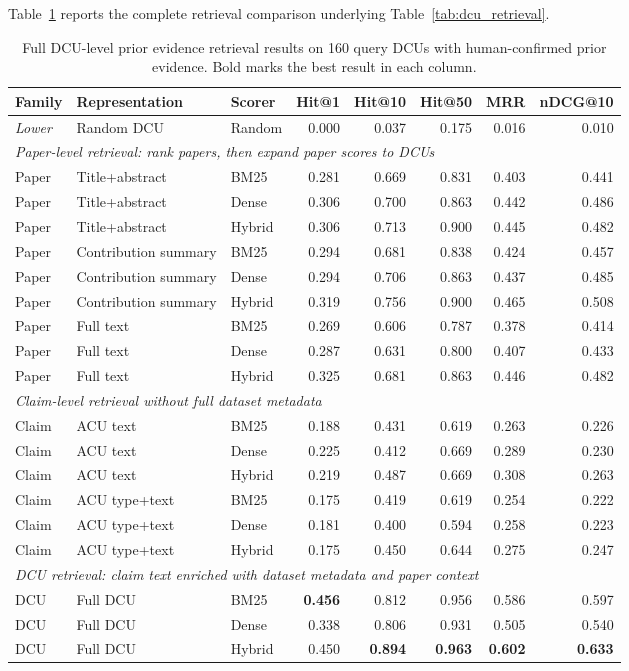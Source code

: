 \documentclass[11pt]{article}
\begin{document}
Table~\ref{tab:dcu_retrieval_full} reports the complete retrieval comparison underlying Table~\ref{tab:dcu_retrieval}.
\begin{table}[h]
\centering
\scriptsize
\setlength{\tabcolsep}{3pt}
\begin{tabular}{lllrrrrr}
\toprule
Family & Representation & Scorer & Hit@1 & Hit@10 & Hit@50 & MRR & nDCG@10 \\
\midrule
\textit{Lower} & Random DCU & Random & 0.000 & 0.037 & 0.175 & 0.016 & 0.010 \\
\midrule
\multicolumn{8}{l}{\textit{Paper-level retrieval: rank papers, then expand paper scores to DCUs}} \\
Paper & Title+abstract & BM25 & 0.281 & 0.669 & 0.831 & 0.403 & 0.441 \\
Paper & Title+abstract & Dense & 0.306 & 0.700 & 0.863 & 0.442 & 0.486 \\
Paper & Title+abstract & Hybrid & 0.306 & 0.713 & 0.900 & 0.445 & 0.482 \\
Paper & Contribution summary & BM25 & 0.294 & 0.681 & 0.838 & 0.424 & 0.457 \\
Paper & Contribution summary & Dense & 0.294 & 0.706 & 0.863 & 0.437 & 0.485 \\
Paper & Contribution summary & Hybrid & 0.319 & 0.756 & 0.900 & 0.465 & 0.508 \\
Paper & Full text & BM25 & 0.269 & 0.606 & 0.787 & 0.378 & 0.414 \\
Paper & Full text & Dense & 0.287 & 0.631 & 0.800 & 0.407 & 0.433 \\
Paper & Full text & Hybrid & 0.325 & 0.681 & 0.863 & 0.446 & 0.482 \\
\midrule
\multicolumn{8}{l}{\textit{Claim-level retrieval without full dataset metadata}} \\
Claim & ACU text & BM25 & 0.188 & 0.431 & 0.619 & 0.263 & 0.226 \\
Claim & ACU text & Dense & 0.225 & 0.412 & 0.669 & 0.289 & 0.230 \\
Claim & ACU text & Hybrid & 0.219 & 0.487 & 0.669 & 0.308 & 0.263 \\
Claim & ACU type+text & BM25 & 0.175 & 0.419 & 0.619 & 0.254 & 0.222 \\
Claim & ACU type+text & Dense & 0.181 & 0.400 & 0.594 & 0.258 & 0.223 \\
Claim & ACU type+text & Hybrid & 0.175 & 0.450 & 0.644 & 0.275 & 0.247 \\
\midrule
\multicolumn{8}{l}{\textit{DCU retrieval: claim text enriched with dataset metadata and paper context}} \\
DCU & Full DCU & BM25 & \textbf{0.456} & 0.812 & 0.956 & 0.586 & 0.597 \\
DCU & Full DCU & Dense & 0.338 & 0.806 & 0.931 & 0.505 & 0.540 \\
DCU & Full DCU & Hybrid & 0.450 & \textbf{0.894} & \textbf{0.963} & \textbf{0.602} & \textbf{0.633} \\
\bottomrule
\end{tabular}
\caption{Full DCU-level prior evidence retrieval results on 160 query DCUs with human-confirmed prior evidence. Bold marks the best result in each column.}
\label{tab:dcu_retrieval_full}
\end{table}
\end{document}
